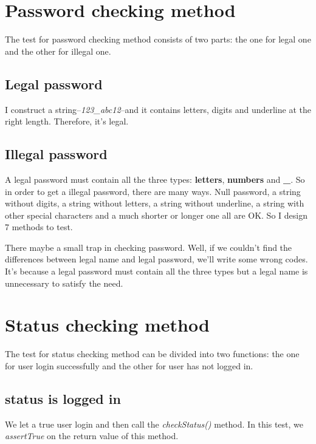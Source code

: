 \documentclass[a4paper]{report}
\begin{document}
\section{Password checking method}
\par The test for password checking method consists of two parts: the one for legal one and the other for illegal one.
\subsection{Legal password}
\par I construct a string--\emph{123\_abc12}--and it contains letters, digits and underline at the right length. Therefore, it's legal.
\subsection{Illegal password}
\par A legal password must contain all the three types: \textbf{letters}, \textbf{numbers} and \textbf{\_}. So in order to get a illegal password, there are many ways. Null password, a string without digits, a string without letters, a string without underline, a string with other special characters and a much shorter or longer one all are OK. So I design 7 methods to test. 
\par There maybe a small trap in checking password. Well, if we couldn't find the differences between legal name and legal password,  we'll write some wrong codes. It's because a legal password must contain all the three types but a legal name is unnecessary to satisfy the need.
\section{Status checking method}
\par The test for status checking method can be divided into two functions: the one for user login successfully and the other for user has not logged in.
\subsection{status is logged in }
\par We let a true user login and then call the \emph{checkStatus()} method. In this test, we \emph{assertTrue} on the return value of this method.
\end{document}
